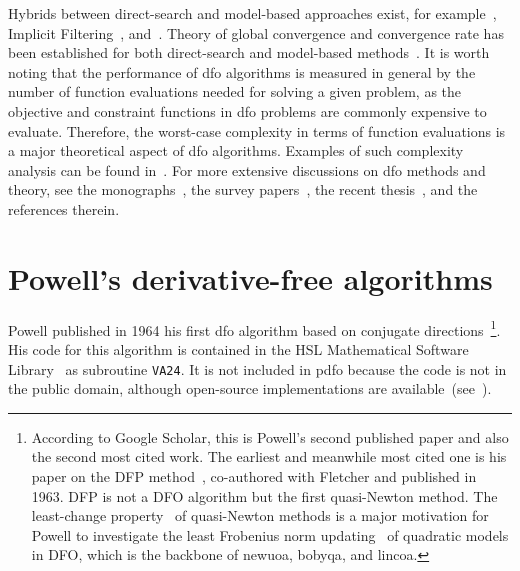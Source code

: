 \documentclass[
    smallextended,  %
    final,        %
]{svjour3}
\begin{document}
Hybrids between direct-search and model-based approaches exist, for example~\cite{Custodio_Vicente_2007}, Implicit Filtering~\cite[Algorithm~4.7]{Kelley_2011}, and~\cite{Conn_Digabel_2013}.
Theory of global convergence and convergence rate has been established for both direct-search and model-based methods~\cite{Torczon_1997,Conn_Scheinberg_Toint_1997a,Kolda_Lewis_Torczon_2003,Conn_Scheinberg_Vicente_2009a,Powell_2012,Vicente_2013,Dodangeh_Vicente_2016,Garmanjani_Judice_Vicente_2016,Gratton_Royer_Vicente_2020}.
It is worth noting that the performance of \gls{dfo} algorithms is measured in general by the number of function evaluations needed for solving a given problem, as the objective and constraint functions in \gls{dfo} problems are commonly
expensive to evaluate.
Therefore, the worst-case complexity in terms of function evaluations is a major theoretical aspect of \gls{dfo} algorithms.
Examples of such complexity analysis can be found in~\cite{Vicente_2013,Gratton_Etal_2015,Dodangeh_Vicente_2016,Dodangeh_Vicente_Zhang_2016}.
For more extensive discussions on \gls{dfo} methods and theory, see the monographs~\cite{Conn_Scheinberg_Vicente_2009b,Audet_Hare_2017}, the survey
papers~\cite{Rios_Sahinidis_2013,Custodio_Scheinberg_Vicente_2017,Larson_Menickelly_Wild_2019}, the recent thesis~\cite{Ragonneau_2022}, and the references therein.

\section{Powell's derivative-free algorithms}
\label{sec:powell}

Powell published in 1964 his first \gls{dfo} algorithm based on conjugate directions~\cite{Powell_1964}\footnote{According to Google Scholar, this is Powell's second published paper and also the second most cited work.
The earliest and meanwhile most cited one is his paper on the DFP method~\cite{Fletcher_Powell_1963},
co-authored with Fletcher and published in 1963. DFP is not a DFO algorithm but the first
quasi-Newton method. The least-change property~\cite{Dennis_Schnabel_1979} of quasi-Newton methods
is a major motivation for Powell to investigate the least Frobenius norm updating~\cite{Powell_2004b}
of quadratic models in DFO, which is the backbone of \gls{newuoa}, \gls{bobyqa}, and \gls{lincoa}.}.
His code for this algorithm is contained in the HSL Mathematical Software Library~\cite{HSL} as subroutine \texttt{VA24}.
It is not included in \gls{pdfo} because the code is not in the public domain, although open-source implementations are available~(see~\cite[footnote~4]{Conn_Scheinberg_Toint_1997b}).
\end{document}
